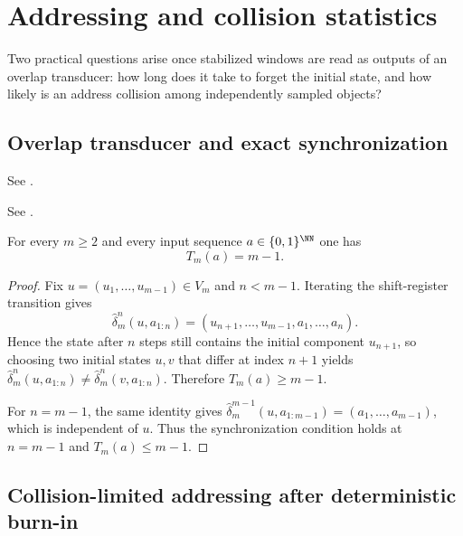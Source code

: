 \section{Addressing and collision statistics}\label{app:addressing}

Two practical questions arise once stabilized windows are read as outputs of an overlap transducer: how long does it take to forget the initial state, and how likely is an address collision among independently sampled objects?

\subsection{Overlap transducer and exact synchronization}\label{sec:causality:sync}

\begin{definition}\label{def:transducer}
See \cite[Definition~6.1]{MaZhang2026Nonlinearity}.
\end{definition}

\begin{definition}\label{def:sync-time}
See \cite[Definition~6.2]{MaZhang2026Nonlinearity}.
\end{definition}

\begin{theorem}\label{thm:exact-sync}
For every $m\ge 2$ and every input sequence $a\in\{0,1\}^{\NN}$ one has
\[
T_m(a)=m-1.
\]
\end{theorem}

\begin{proof}
Fix $u=(u_1,\dots,u_{m-1})\in V_m$ and $n<m-1$. Iterating the shift-register transition gives
\[
\hat{\delta}_m^n(u,a_{1:n})=(u_{n+1},\dots,u_{m-1},a_1,\dots,a_n).
\]
Hence the state after $n$ steps still contains the initial component $u_{n+1}$, so choosing two initial states $u,v$ that differ at index $n+1$ yields $\hat{\delta}_m^n(u,a_{1:n})\neq \hat{\delta}_m^n(v,a_{1:n})$. Therefore $T_m(a)\ge m-1$.

For $n=m-1$, the same identity gives $\hat{\delta}_m^{m-1}(u,a_{1:m-1})=(a_1,\dots,a_{m-1})$, which is independent of $u$. Thus the synchronization condition holds at $n=m-1$ and $T_m(a)\le m-1$.
\end{proof}

\subsection{Collision-limited addressing after deterministic burn-in}\label{sec:causality:capacity}

